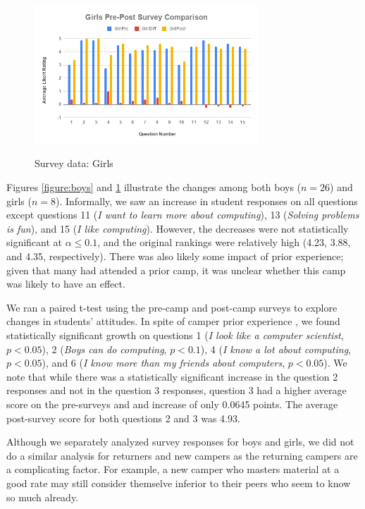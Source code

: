 \begin{figure}
\includegraphics[width=3.3in]{images/girls}
\label{figure:girls}
\caption{Survey data: Girls}
\end{figure}

Figures \ref{figure:boys} and \ref{figure:girls} illustrate the changes
among both boys ($n=26$) and girls ($n=8$).
Informally, we saw an increase in student responses on all questions
except questions 11 (\textit{I want to learn more about computing}), 
13 (\textit{Solving problems is fun}), and 15 (\textit{I like computing}).
However, the decreases were not statistically significant at $\alpha\le 0.1$,
and the original rankings were relatively high (4.23, 3.88, and 4.35,
respectively).  There was also likely some impact of prior experience;
given that many had attended a prior camp, it was unclear whether this
camp was likely to have an effect.

We ran a paired t-test using the pre-camp and post-camp surveys to
explore changes in students' attitudes.  In spite of camper prior
experience , we found statistically significant growth on questions
1 (\textit{I look like a computer scientist}, $p < 0.05$), 2
(\textit{Boys can do computing}, $p < 0.1$), 4 (\textit{I know a
lot about computing}, $p < 0.05$), and 6 (\textit{I know more than
my friends about computers}, $p < 0.05$).  We note that while there
was a statistically significant increase in the question 2 responses
and not in the question 3 responses, question 3 had a higher average
score on the pre-surveys and and increase of only 0.0645 points.
The average post-survey score for both questions 2 and 3 was 4.93.

Although we separately analyzed survey responses for boys and girls,
we did not do a similar analysis for returners and new campers as
the returning campers are a complicating factor.  For example, a
new camper who masters material at a good rate may still consider
themselve inferior to their peers who seem to know so much already.

